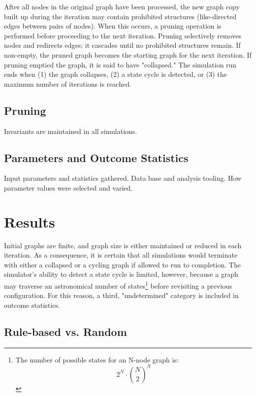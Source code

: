 \documentclass[twoside,twocolumn]{article}
\begin{document}
After all nodes in the original graph have been processed, the new graph copy
built up during the iteration may
contain prohibited structures (like-directed edges between pairs of nodes).
When this occurs, a pruning operation is
performed before proceeding to the next iteration. Pruning selectively removes
nodes and redirects edges; it cascades until no prohibited structures remain.
If non-empty, the pruned graph becomes the starting graph for the next iteration.
If pruning emptied the graph, it is said to have "collapsed."
The simulation run ends when (1) the graph collapses, (2) a state cycle is detected,
or (3) the maximum number of iterations is reached.

\subsection{Pruning}

Invariants are maintained in all simulations.

\subsection{Parameters and Outcome Statistics}

Input parameters and statistics gathered. Data base and analysis tooling.
How parameter values were selected and varied.


\section{Results}

Initial graphs are finite, and graph size is either maintained
or reduced in each iteration. As a consequence, it is certain that all
simulations
would terminate with either a collapsed or a cycling graph if allowed to
run to completion. The simulator's ability to detect a state cycle is
limited, however, because a graph may traverse an astronomical
number of states\footnote{The number of possible states for an N-node graph is:
\[
2^N\cdot\binom{N}{2}^N
\]
}
before revisiting a previous configuration.
For this reason, a third, "undetermined" category is included in
outcome statistics.

\subsection{Rule-based vs. Random}
\end{document}
